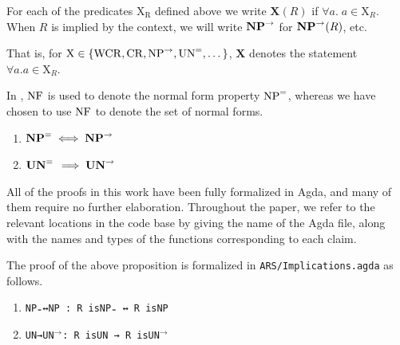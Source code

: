 
\begin{notation}
    For each of the predicates $\mathrm{X_R}$ defined above we write
    $\mathbf{X}(R)$ if $\forall a.\; a \in \mathrm{X}_R$. When $R$ is implied by the context, we will write $\mathbf{NP}^{\to}$ for $\mathbf{NP}^{\to}(R)$, etc.

    That is, for $\mathrm{X} \in \{\mathrm{WCR} , \mathrm{CR} , \mathrm{NP}^{\to} , \mathrm{UN}^{=}, \dots \}$, $\mathbf{X}$ denotes the statement $\forall a. a \in \mathrm{X}_R$.
\end{notation}


In \terese, $\mathrm{NF}$ is used to denote the normal form property $\mathrm{NP}^{=}$, whereas we have chosen to use $\mathrm{NF}$ to denote the set of normal forms.

\begin{proposition}\hfill
    \begin{enumerate}
        \item $\mathbf{NP}^{=} \iff \mathbf{NP}^{\to}$
        \item $\mathbf{UN}^{=} \, \implies \mathbf{UN}^{\to}$
    \end{enumerate}
\end{proposition}
  All of the proofs in this work have been fully formalized in Agda, and many of them require no further elaboration.  Throughout the paper, we refer to the relevant locations in the code base by giving the name of the Agda file, along with the names and types of the functions corresponding to each claim.

The proof of the above proposition is formalized in \texttt{ARS/Implications.agda} as follows.
    \begin{enumerate}
        \item \verb|NP₌↔NP : R isNP₌ ↔ R isNP|
        \item \verb|UN→|\texttt{UN}$^{\to}$\verb|: R isUN → R is|\texttt{UN}$^{\to}$ \qedhere
    \end{enumerate}

